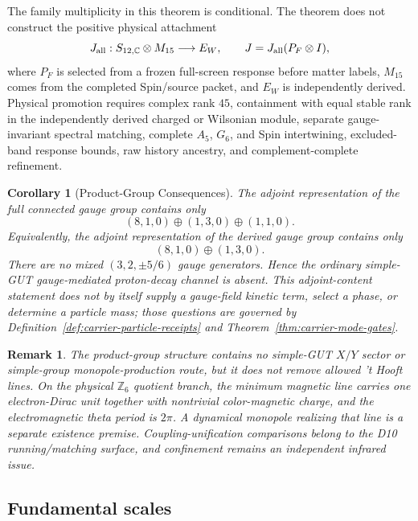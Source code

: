 \documentclass[11pt]{article}
\newtheorem{corollary}[theorem]{Corollary}
\newtheorem{remark}[theorem]{Remark}
\begin{document}
The family multiplicity in this theorem is conditional. The theorem does not
construct the positive physical attachment
\[
J_{\rm all}:S_{12,\mathbb C}\otimes M_{15}\longrightarrow E_W,
\qquad J=J_{\rm all}(P_F\otimes I),
\]
where \(P_F\) is selected from a frozen full-screen response before matter
labels, \(M_{15}\) comes from the completed Spin/source packet, and \(E_W\) is
independently derived. Physical promotion requires complex rank \(45\),
containment with equal stable rank in the independently derived charged or
Wilsonian module, separate gauge-invariant spectral matching, complete
\(A_5\), \(G_6\), and Spin intertwining, excluded-band response bounds, raw
history ancestry, and complement-complete refinement.

\begin{corollary}[Product-Group Consequences]
The adjoint representation of the full connected gauge group contains only
\[
(8,1,0)\oplus(1,3,0)\oplus(1,1,0).
\]
Equivalently, the adjoint representation of the derived gauge group contains only
\[
(8,1,0)\oplus(1,3,0).
\]
There are no mixed $(3,2,\pm 5/6)$ gauge generators. Hence the ordinary simple-GUT
gauge-mediated proton-decay channel is absent. This adjoint-content statement does not by itself
supply a gauge-field kinetic term, select a phase, or determine a particle mass; those questions
are governed by Definition~\ref{def:carrier-particle-receipts} and
Theorem~\ref{thm:carrier-mode-gates}.
\end{corollary}

\begin{remark}
The product-group structure contains no simple-GUT \(X/Y\) sector or simple-group monopole-production route, but it does not remove allowed 't Hooft lines. On the physical \(\mathbb Z_6\) quotient branch, the minimum magnetic line carries one electron-Dirac unit together with nontrivial color-magnetic charge, and the electromagnetic theta period is \(2\pi\). A dynamical monopole realizing that line is a separate existence premise. Coupling-unification comparisons belong to the D10 running/matching surface, and confinement remains an independent infrared issue.
\end{remark}

\subsection{Fundamental scales}
\end{document}
